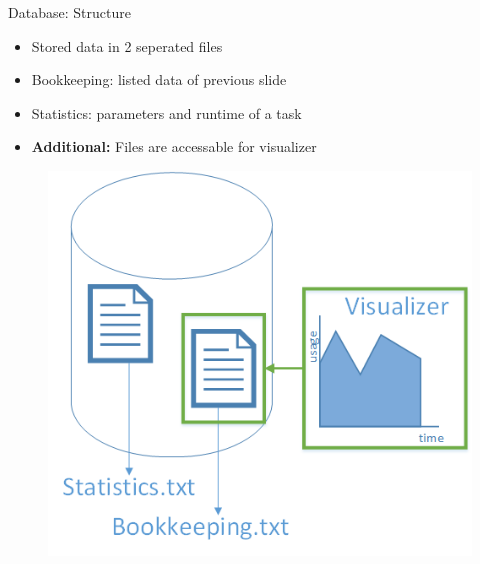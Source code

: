 	\begin{frame}{Database: Structure}
		\begin{minipage}[]{.5\textwidth}%
		\begin{itemize}
		\item<1->{} {Stored data in 2 seperated files}
		\item<2->{} {Bookkeeping: listed data of previous slide}
		\item<3->{} {Statistics: parameters and runtime of a task}
		\item<4->{} {\textbf{Additional: }Files are accessable for visualizer}
		\end{itemize}
		\end{minipage}
		\begin{minipage}[]{.45\textwidth}%
		\begin{figure}[h]
		\flushright  %
		\vspace{-\ht\strutbox}\includegraphics[width=\textwidth]{images/Task/data.png}
		\end{figure}
		\end{minipage}
	\end{frame}
